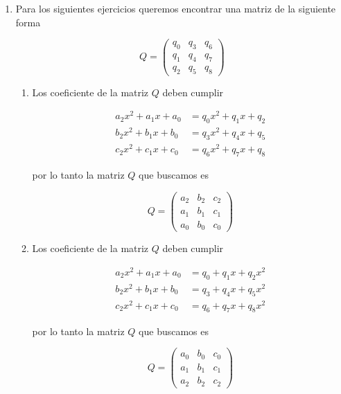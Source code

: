 \documentclass[letterpaper]{article}
\theoremstyle{definition}
\theoremstyle{lemathm}
\theoremstyle{lemademthm}
\begin{document}
\begin{enumerate}
\begin{enumerate}
		\end{enumerate}

		\item Para los siguientes ejercicios queremos encontrar una matriz de la siguiente forma
		
		\[Q = \begin{pmatrix}
			q_0 & q_3 & q_6\\
			q_1 & q_4 & q_7\\
			q_2 & q_5 & q_8
		\end{pmatrix}\]

		\begin{enumerate}

			\item Los coeficiente de la matriz $Q$ deben cumplir
			
			\begin{align*}
				a_2x^2 + a_1x + a_0 &= q_0x^2 + q_1x + q_2\\
				b_2x^2 + b_1x + b_0 &= q_3x^2 + q_4x + q_5\\
				c_2x^2 + c_1x + c_0 &= q_6x^2 + q_7x + q_8
			\end{align*}

			por lo tanto la matriz $Q$ que buscamos es

			\[Q = \begin{pmatrix}
				a_2 & b_2 & c_2\\
				a_1 & b_1 & c_1\\
				a_0 & b_0 & c_0
			\end{pmatrix}\]

			\item Los coeficiente de la matriz $Q$ deben cumplir
			
			\begin{align*}
				a_2x^2 + a_1x + a_0 &= q_0 + q_1x + q_2x^2\\
				b_2x^2 + b_1x + b_0 &= q_3 + q_4x + q_5x^2\\
				c_2x^2 + c_1x + c_0 &= q_6 + q_7x + q_8x^2
			\end{align*}

			por lo tanto la matriz $Q$ que buscamos es

			\[Q = \begin{pmatrix}
				a_0 & b_0 & c_0\\
				a_1 & b_1 & c_1\\
				a_2 & b_2 & c_2
			\end{pmatrix}\]
		
		\end{enumerate}


\end{enumerate}
\end{document}

